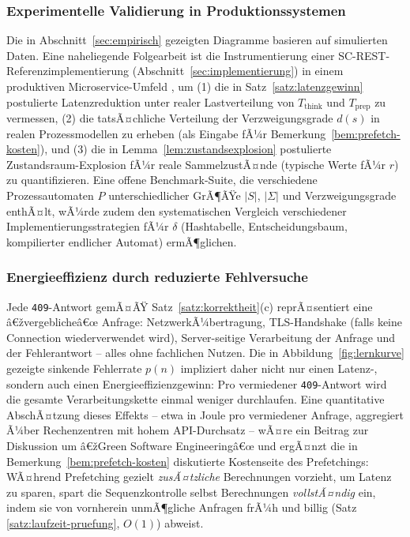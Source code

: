 ﻿\documentclass[a4paper,12pt]{article}
\theoremstyle{definition}
\begin{document}
\subsubsection{Experimentelle Validierung in Produktionssystemen}

Die in Abschnitt~\ref{sec:empirisch} gezeigten Diagramme basieren auf simulierten Daten.
Eine naheliegende Folgearbeit ist die Instrumentierung einer SC-REST-Referenzimplementierung
(Abschnitt~\ref{sec:implementierung}) in einem produktiven Microservice-Umfeld
\cite{newman2021}, um (1) die in Satz~\ref{satz:latenzgewinn} postulierte
Latenzreduktion unter realer Lastverteilung von $T_{\mathrm{think}}$ und
$T_{\mathrm{prep}}$ zu vermessen, (2) die tatsÃ¤chliche Verteilung der
Verzweigungsgrade $d(s)$ in realen Prozessmodellen zu erheben (als Eingabe fÃ¼r
Bemerkung~\ref{bem:prefetch-kosten}), und (3) die in Lemma~\ref{lem:zustandsexplosion}
postulierte Zustandsraum-Explosion fÃ¼r reale SammelzustÃ¤nde (typische Werte fÃ¼r $r$) zu
quantifizieren. Eine offene Benchmark-Suite, die verschiedene Prozessautomaten
$P$ unterschiedlicher GrÃ¶ÃŸe $|S|$, $|\Sigma|$ und Verzweigungsgrade enthÃ¤lt, wÃ¼rde
zudem den systematischen Vergleich verschiedener Implementierungsstrategien fÃ¼r $\delta$
(Hashtabelle, Entscheidungsbaum, kompilierter endlicher Automat) ermÃ¶glichen.

\subsubsection{Energieeffizienz durch reduzierte Fehlversuche}

Jede \texttt{409}-Antwort gemÃ¤ÃŸ Satz~\ref{satz:korrektheit}(c) reprÃ¤sentiert eine
â€žvergeblicheâ€œ Anfrage: NetzwerkÃ¼bertragung, TLS-Handshake (falls keine Connection
wiederverwendet wird), Server-seitige Verarbeitung der Anfrage und der Fehlerantwort --
alles ohne fachlichen Nutzen. Die in Abbildung~\ref{fig:lernkurve} gezeigte sinkende
Fehlerrate $p(n)$ impliziert daher nicht nur einen Latenz-, sondern auch einen
Energieeffizienzgewinn: Pro vermiedener \texttt{409}-Antwort wird die gesamte
Verarbeitungskette einmal weniger durchlaufen. Eine quantitative AbschÃ¤tzung dieses
Effekts -- etwa in Joule pro vermiedener Anfrage, aggregiert Ã¼ber Rechenzentren mit
hohem API-Durchsatz -- wÃ¤re ein Beitrag zur Diskussion um â€žGreen Software Engineeringâ€œ und
ergÃ¤nzt die in Bemerkung~\ref{bem:prefetch-kosten} diskutierte Kostenseite des
Prefetchings: WÃ¤hrend Prefetching gezielt \emph{zusÃ¤tzliche} Berechnungen vorzieht, um
Latenz zu sparen, spart die Sequenzkontrolle selbst Berechnungen \emph{vollstÃ¤ndig} ein,
indem sie von vornherein unmÃ¶gliche Anfragen frÃ¼h und billig (Satz
\ref{satz:laufzeit-pruefung}, $O(1)$) abweist.
\end{document}
